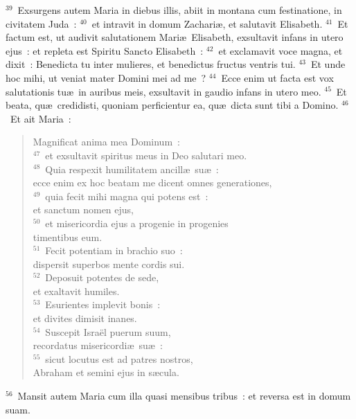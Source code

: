 ${}^{39}$~Exsurgens autem Maria in diebus illis, abiit in montana cum festinatione, in civitatem Juda~:
${}^{40}$~et intravit in domum Zachari\ae , et salutavit Elisabeth.
${}^{41}$~Et factum est, ut audivit salutationem Mari\ae\ Elisabeth, exsultavit infans in utero ejus~: et repleta est Spiritu Sancto Elisabeth~:
${}^{42}$~et exclamavit voce magna, et dixit~: Benedicta tu inter mulieres, et benedictus fructus ventris tui.
${}^{43}$~Et unde hoc mihi, ut veniat mater Domini mei ad me~?
${}^{44}$~Ecce enim ut facta est vox salutationis tu\ae\ in auribus meis, exsultavit in gaudio infans in utero meo.
${}^{45}$~Et beata, qu\ae\ credidisti, quoniam perficientur ea, qu\ae\ dicta sunt tibi a Domino.
${}^{46}$~Et ait Maria~: \begin{flushleft}\begin{verse}Magnificat anima mea Dominum~:\\
${}^{47}$~et exsultavit spiritus meus in Deo salutari meo.\\
${}^{48}$~Quia respexit humilitatem ancill\ae\ su\ae~:\\ ecce enim ex hoc beatam me dicent omnes generationes,\\
${}^{49}$~quia fecit mihi magna qui potens est~:\\ et sanctum nomen ejus,\\
${}^{50}$~et misericordia ejus a progenie in progenies\\ timentibus eum.\\
${}^{51}$~Fecit potentiam in brachio suo~:\\ dispersit superbos mente cordis sui.\\
${}^{52}$~Deposuit potentes de sede,\\ et exaltavit humiles.\\
${}^{53}$~Esurientes implevit bonis~:\\ et divites dimisit inanes.\\
${}^{54}$~Suscepit Isra\"el puerum suum,\\ recordatus misericordi\ae\ su\ae~:\\
${}^{55}$~sicut locutus est ad patres nostros,\\ Abraham et semini ejus in s\ae cula.\end{verse}\end{flushleft}


${}^{56}$~Mansit autem Maria cum illa quasi mensibus tribus~: et reversa est in domum suam.


